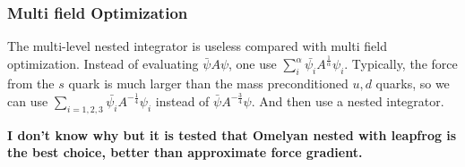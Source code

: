 \subsubsection{\label{sec:multifieldOptimization}Multi field Optimization}

The multi-level nested integrator is useless compared with multi field optimization. Instead of evaluating $\bar{\psi} A \psi$, one use $\sum _i^{\alpha} \bar{\psi _i} A^{\frac{1}{\alpha}} \psi _i$. Typically, the force from the $s$ quark is much larger than the mass preconditioned $u,d$ quarks, so we can use $\sum _{i=1,2,3} \bar{\psi _i} A^{-\frac{1}{4}} \psi _i$ instead of $\bar{\psi} A^{-\frac{3}{4}} \psi$. And then use a nested integrator.

\textbf{\textcolor[rgb]{0,0,1}{I don't know why but it is tested that Omelyan nested with leapfrog is the best choice, better than approximate force gradient.}}

